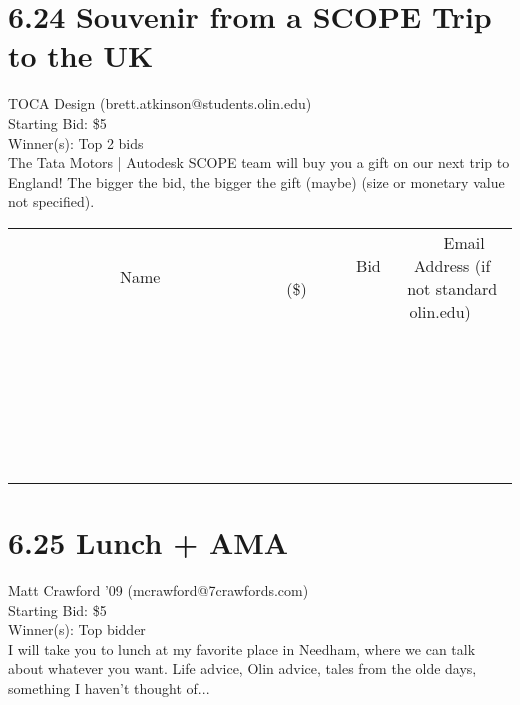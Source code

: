 \documentclass[11pt]{article}
\begin{document}
\section*{6.24 Souvenir from a SCOPE Trip to the UK}
TOCA Design (brett.atkinson@students.olin.edu) \\
Starting Bid: \$5 \\
Winner(s): 
Top 2 bids \\
The Tata Motors | Autodesk SCOPE team will buy you a gift on our next trip to England! The bigger the bid, the bigger the gift (maybe) (size or monetary value not specified). \\[6ex]
\begin{tabular}{c c c}
~~~~~~~~~~~~~Name~~~~~~~~~~~~~ & ~~~~~~~~~Bid (\$)~~~~~~~~~ & ~~~Email Address (if not standard olin.edu)~~~ \\
 & & \\
\hline
 & & \\
\hline
 & & \\
\hline
 & & \\
\hline
 & & \\
\hline
 & & \\
\hline
 & & \\
\hline
 & & \\
\hline
 & & \\
\hline
 & & \\
\hline
 & & \\
\hline
 & & \\
\hline
 & & \\
\hline
 & & \\
\hline
 & & \\
\hline
 & & \\
\hline
 & & \\
\hline
 & & \\
\hline
 & & \\
\hline
 & & \\
\hline
 & & \\
\hline
 & & \\
\hline
 & & \\
\hline
 & & \\
\hline
 & & \\
\hline
 & & \\
\hline
\end{tabular}
\clearpage
\section*{6.25 Lunch + AMA}
Matt Crawford '09 (mcrawford@7crawfords.com) \\
Starting Bid: \$5 \\
Winner(s): 
Top bidder \\
I will take you to lunch at my favorite place in Needham, where we can talk about whatever you want.  Life advice, Olin advice, tales from the olde days, something I haven't thought of...
\end{document}
